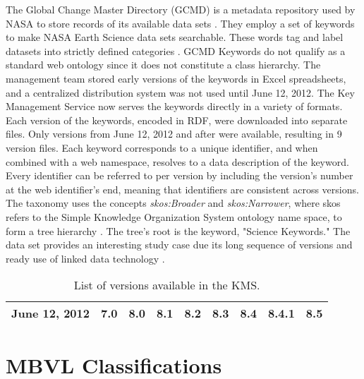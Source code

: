 The Global Change Master Directory (GCMD) is a metadata repository used by NASA to store records of its available data sets \cite{Miled:2001:GCM:372202.372324}.
They employ a set of keywords to make NASA Earth Science data sets searchable.
These words tag and label datasets into strictly defined categories \cite{GCMDKey}.
GCMD Keywords do not qualify as a standard web ontology since it does not constitute a class hierarchy.
The management team stored early versions of the keywords in Excel spreadsheets, and a centralized distribution system was not used until June 12, 2012.
The Key Management Service now serves the keywords directly in a variety of formats.
Each version of the keywords, encoded in RDF, were downloaded into separate files.
Only versions from June 12, 2012 and after were available, resulting in 9 version files.
Each keyword corresponds to a unique identifier, and when combined with a web namespace, resolves to a data description of the keyword.
Every identifier can be referred to per version by including the version's number at the web identifier's end, meaning that identifiers are consistent across versions.
The taxonomy uses the concepts \textit{skos:Broader} and \textit{skos:Narrower}, where skos refers to the Simple Knowledge Organization System ontology name space, to form a tree hierarchy \cite{skos}.
The tree's root is the keyword, "Science Keywords."
The data set provides an interesting study case due its long sequence of versions and ready use of linked data technology \cite{Stevens2016}.

\begin{table}
	\caption{List of versions available in the KMS.}
	\label{gcmd_table}
	\centering
	\begin{tabular}{|c|c|c|c|c|c|c|c|c|}
		\hline
		June 12, 2012 & 7.0 & 8.0 & 8.1 & 8.2 & 8.3 & 8.4 & 8.4.1 & 8.5 \\
		\hline
	\end{tabular}
\end{table}

\section{MBVL Classifications} \label{sec:MBVL}

